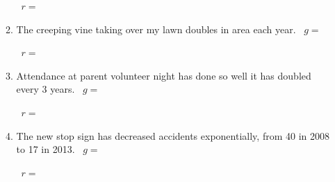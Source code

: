 \begin{enumerate}
\begin{enumerate}
~\hfill $r=$ \hspace{1in} 
\vfill
\item The creeping vine taking over my lawn doubles in area each year. \vfill
~\hfill $g=$ \hspace{1in} 

~\hfill $r=$ \hspace{1in} 
\vfill
\item Attendance at parent volunteer night has done so well it has doubled every 3 years.\vfill
~\hfill $g=$ \hspace{1in} 

~\hfill $r=$ \hspace{1in} 
\vfill
\item The new stop sign has decreased accidents exponentially, from 40 in 2008 to 17 in 2013. \vfill
~\hfill $g=$ \hspace{1in} 

~\hfill $r=$ \hspace{1in} 
\vfill
\end{enumerate}


\end{enumerate}
